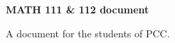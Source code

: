 \documentclass{article}
\begin{document}
\pagestyle{empty}
\begin{center}
    \Huge
    \bfseries MATH 111 \& 112 document

    \vspace{14cm}
    A document for the students of PCC.
\end{center}
\end{document}
